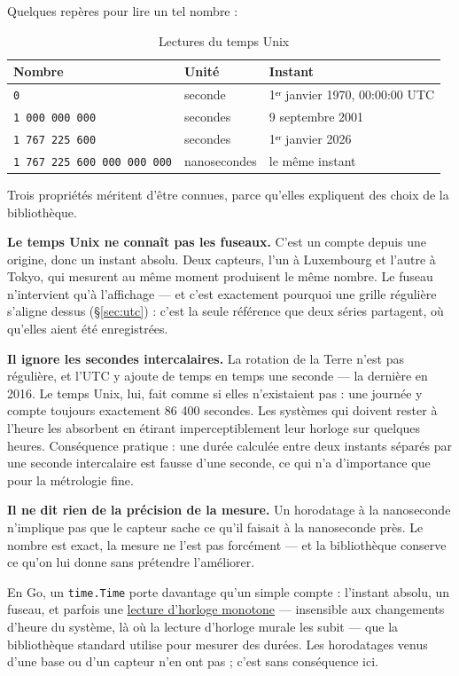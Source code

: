 \documentclass[11pt,a4paper]{report}
\begin{document}
Quelques repères pour lire un tel nombre :

\begin{longtable}[]{@{}lll@{}}
\caption{Lectures du temps Unix}\label{tab:unix}\\
\toprule\noalign{}
Nombre & Unité & Instant \\
\midrule\noalign{}
\endhead
\bottomrule\noalign{}
\endlastfoot
\texttt{0} & seconde & 1ᵉʳ janvier 1970, 00:00:00 UTC \\
\texttt{1\ 000\ 000\ 000} & secondes & 9 septembre 2001 \\
\texttt{1\ 767\ 225\ 600} & secondes & 1ᵉʳ janvier 2026 \\
\texttt{1\ 767\ 225\ 600\ 000\ 000\ 000} & nanosecondes & le même
instant \\
\end{longtable}

Trois propriétés méritent d'être connues, parce qu'elles expliquent des
choix de la bibliothèque.

\textbf{Le temps Unix ne connaît pas les fuseaux.} C'est un compte
depuis une origine, donc un instant absolu. Deux capteurs, l'un à
Luxembourg et l'autre à Tokyo, qui mesurent au même moment produisent le
même nombre. Le fuseau n'intervient qu'à l'affichage --- et c'est
exactement pourquoi une grille régulière s'aligne dessus (\S\ref{sec:utc}) : c'est
la seule référence que deux séries partagent, où qu'elles aient été
enregistrées.

\textbf{Il ignore les secondes intercalaires.} La rotation de la Terre
n'est pas régulière, et l'UTC y ajoute de temps en temps une seconde ---
la dernière en 2016. Le temps Unix, lui, fait comme si elles
n'existaient pas : une journée y compte toujours exactement 86 400
secondes. Les systèmes qui doivent rester à l'heure les absorbent en
étirant imperceptiblement leur horloge sur quelques heures. Conséquence
pratique : une durée calculée entre deux instants séparés par une
seconde intercalaire est fausse d'une seconde, ce qui n'a d'importance
que pour la métrologie fine.

\textbf{Il ne dit rien de la précision de la mesure.} Un horodatage à la
nanoseconde n'implique pas que le capteur sache ce qu'il faisait à la
nanoseconde près. Le nombre est exact, la mesure ne l'est pas forcément
--- et la bibliothèque conserve ce qu'on lui donne sans prétendre
l'améliorer.

En Go, un \texttt{time.Time} porte davantage qu'un simple compte :
l'instant absolu, un fuseau, et parfois une
\href{https://pkg.go.dev/time\#hdr-Monotonic_Clocks}{lecture d'horloge
monotone} --- insensible aux changements d'heure du système, là où la
lecture d'horloge murale les subit --- que la bibliothèque standard
utilise pour mesurer des durées. Les horodatages
venus d'une base ou d'un capteur n'en ont pas ; c'est sans conséquence
ici.
\end{document}
